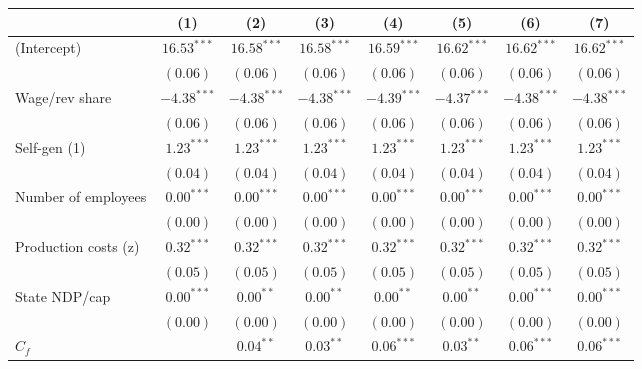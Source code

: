 
\begin{tabular}{l c c c c c c c }
\toprule
 & (1) & (2) & (3) & (4) & (5) & (6) & (7) \\
\midrule
(Intercept)                      & $16.53^{***}$ & $16.58^{***}$ & $16.58^{***}$ & $16.59^{***}$ & $16.62^{***}$ & $16.62^{***}$ & $16.62^{***}$ \\
                                 & $(0.06)$      & $(0.06)$      & $(0.06)$      & $(0.06)$      & $(0.06)$      & $(0.06)$      & $(0.06)$      \\
Wage/rev share                   & $-4.38^{***}$ & $-4.38^{***}$ & $-4.38^{***}$ & $-4.39^{***}$ & $-4.37^{***}$ & $-4.38^{***}$ & $-4.38^{***}$ \\
                                 & $(0.06)$      & $(0.06)$      & $(0.06)$      & $(0.06)$      & $(0.06)$      & $(0.06)$      & $(0.06)$      \\
Self-gen (1)                     & $1.23^{***}$  & $1.23^{***}$  & $1.23^{***}$  & $1.23^{***}$  & $1.23^{***}$  & $1.23^{***}$  & $1.23^{***}$  \\
                                 & $(0.04)$      & $(0.04)$      & $(0.04)$      & $(0.04)$      & $(0.04)$      & $(0.04)$      & $(0.04)$      \\
Number of employees              & $0.00^{***}$  & $0.00^{***}$  & $0.00^{***}$  & $0.00^{***}$  & $0.00^{***}$  & $0.00^{***}$  & $0.00^{***}$  \\
                                 & $(0.00)$      & $(0.00)$      & $(0.00)$      & $(0.00)$      & $(0.00)$      & $(0.00)$      & $(0.00)$      \\
Production costs (z)             & $0.32^{***}$  & $0.32^{***}$  & $0.32^{***}$  & $0.32^{***}$  & $0.32^{***}$  & $0.32^{***}$  & $0.32^{***}$  \\
                                 & $(0.05)$      & $(0.05)$      & $(0.05)$      & $(0.05)$      & $(0.05)$      & $(0.05)$      & $(0.05)$      \\
State NDP/cap                    & $0.00^{***}$  & $0.00^{**}$   & $0.00^{**}$   & $0.00^{**}$   & $0.00^{**}$   & $0.00^{***}$  & $0.00^{***}$  \\
                                 & $(0.00)$      & $(0.00)$      & $(0.00)$      & $(0.00)$      & $(0.00)$      & $(0.00)$      & $(0.00)$      \\
$C_{f}$                          &               & $0.04^{**}$   & $0.03^{**}$   & $0.06^{***}$  & $0.03^{**}$   & $0.06^{***}$  & $0.06^{***}$  \\

\end{tabular}
